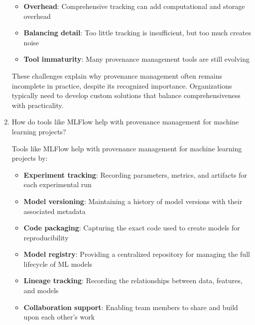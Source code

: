 \documentclass[12pt]{article}
\begin{document}
\begin{enumerate}
\begin{tcolorbox}[colback=blue!5!white,colframe=blue!75!black,title={Solution}]
\begin{itemize}
        \item \textbf{Overhead}: Comprehensive tracking can add computational and storage overhead
        
        \item \textbf{Balancing detail}: Too little tracking is insufficient, but too much creates noise
        
        \item \textbf{Tool immaturity}: Many provenance management tools are still evolving
    \end{itemize}
    
    These challenges explain why provenance management often remains incomplete in practice, despite its recognized importance. Organizations typically need to develop custom solutions that balance comprehensiveness with practicality.
    \end{tcolorbox}
    
    \item How do tools like MLFlow help with provenance management for machine learning projects?
    
    \begin{tcolorbox}[colback=blue!5!white,colframe=blue!75!black,title={Solution}]
    Tools like MLFlow help with provenance management for machine learning projects by:
    
    \begin{itemize}
        \item \textbf{Experiment tracking}: Recording parameters, metrics, and artifacts for each experimental run
        
        \item \textbf{Model versioning}: Maintaining a history of model versions with their associated metadata
        
        \item \textbf{Code packaging}: Capturing the exact code used to create models for reproducibility
        
        \item \textbf{Model registry}: Providing a centralized repository for managing the full lifecycle of ML models
        
        \item \textbf{Lineage tracking}: Recording the relationships between data, features, and models
        
        \item \textbf{Collaboration support}: Enabling team members to share and build upon each other's work
        

\end{itemize}
\end{tcolorbox}
\end{enumerate}
\end{document}
